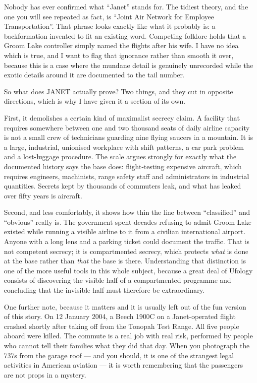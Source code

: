 \begin{funfact}
Nobody has ever confirmed what ``Janet'' stands for. The tidiest theory, and the one you
will see repeated as fact, is ``Joint Air Network for Employee Transportation''. That
phrase looks exactly like what it probably is: a backformation invented to fit an existing
word. Competing folklore holds that a Groom Lake controller simply named the flights after
his wife. I have no idea which is true, and I want to flag that ignorance rather than
smooth it over, because this is a case where the mundane detail is genuinely unrecorded
while the exotic details around it are documented to the tail number.
\end{funfact}

So what does JANET actually prove? Two things, and they cut in opposite directions, which
is why I have given it a section of its own.

First, it demolishes a certain kind of maximalist secrecy claim. A facility that requires
somewhere between one and two thousand seats of daily airline capacity is not a small
crew of technicians guarding nine flying saucers in a mountain. It is a large, industrial,
unionised workplace with shift patterns, a car park problem and a lost-luggage procedure.
The scale argues strongly for exactly what the documented history says the base does:
flight-testing expensive aircraft, which requires engineers, machinists, range safety
staff and administrators in industrial quantities. Secrets kept by thousands of commuters
leak, and what has leaked over fifty years is aircraft.

Second, and less comfortably, it shows how thin the line between ``classified'' and
``obvious'' really is. The government spent decades refusing to admit Groom Lake existed
while running a visible airline to it from a civilian international airport. Anyone with a
long lens and a parking ticket could document the traffic. That is not competent secrecy;
it is compartmented secrecy, which protects \emph{what} is done at the base rather than
\emph{that} the base is there. Understanding that distinction is one of the more useful
tools in this whole subject, because a great deal of Ufology consists of discovering the
visible half of a compartmented programme and concluding that the invisible half must
therefore be extraordinary.

One further note, because it matters and it is usually left out of the fun version of this
story. On 12 January 2004, a Beech 1900C on a Janet-operated flight crashed shortly after
taking off from the Tonopah Test Range. All five people aboard were killed. The commute is
a real job with real risk, performed by people who cannot tell their families what they did
that day. When you photograph the 737s from the garage roof --- and you should, it is one of
the strangest legal activities in American aviation --- it is worth remembering that the
passengers are not props in a mystery.

